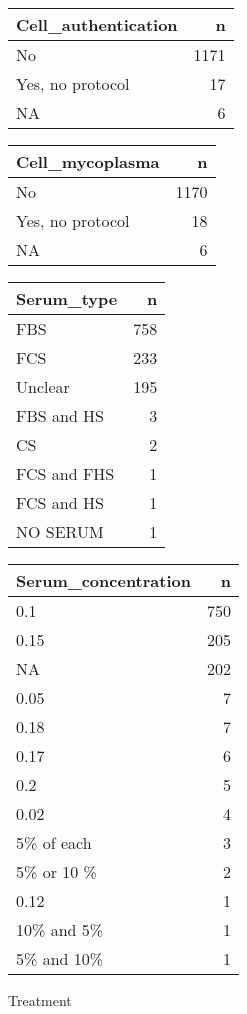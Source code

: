 \documentclass[
]{article}
\begin{document}
\begin{longtable}[]{@{}lr@{}}
\toprule()
Cell\_authentication & n \\
\midrule()
\endhead
No & 1171 \\
Yes, no protocol & 17 \\
NA & 6 \\
\bottomrule()
\end{longtable}

\begin{longtable}[]{@{}lr@{}}
\toprule()
Cell\_mycoplasma & n \\
\midrule()
\endhead
No & 1170 \\
Yes, no protocol & 18 \\
NA & 6 \\
\bottomrule()
\end{longtable}

\begin{longtable}[]{@{}lr@{}}
\toprule()
Serum\_type & n \\
\midrule()
\endhead
FBS & 758 \\
FCS & 233 \\
Unclear & 195 \\
FBS and HS & 3 \\
CS & 2 \\
FCS and FHS & 1 \\
FCS and HS & 1 \\
NO SERUM & 1 \\
\bottomrule()
\end{longtable}

\begin{longtable}[]{@{}lr@{}}
\toprule()
Serum\_concentration & n \\
\midrule()
\endhead
0.1 & 750 \\
0.15 & 205 \\
NA & 202 \\
0.05 & 7 \\
0.18 & 7 \\
0.17 & 6 \\
0.2 & 5 \\
0.02 & 4 \\
5\% of each & 3 \\
5\% or 10 \% & 2 \\
0.12 & 1 \\
10\% and 5\% & 1 \\
5\% and 10\% & 1 \\
\bottomrule()
\end{longtable}

Treatment
\end{document}
